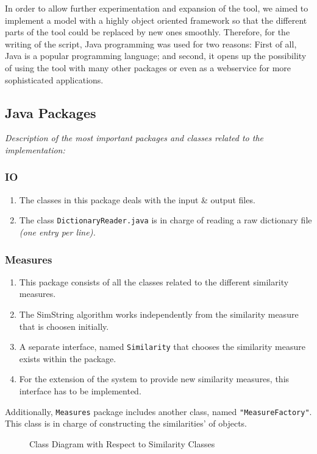 In order to allow further experimentation and expansion of the tool, we aimed to implement a model with a highly object oriented framework so that the different parts of the tool could be replaced by new ones smoothly. Therefore, for the writing of the script, Java programming was used for two reasons: First of all, Java is a popular programming language; and second, it opens up the possibility of using the tool with many other packages or even as a webservice for more sophisticated applications.
\subsection{Java Packages}
\emph{Description of the most important  packages and classes related to the implementation:}
\subsubsection*{IO}
\begin{enumerate}[-]
	\item The classes in this package deals with the input \& output files.
	\item The class \texttt{DictionaryReader.java} is in charge of reading a raw dictionary file \textit{(one entry per line).}
\end{enumerate}

\subsubsection*{Measures}
\begin{enumerate}[-]
	\item This package consists of all the classes related to the different similarity measures.
	\item The SimString algorithm works independently from the similarity measure that is choosen initially.
	\item A separate interface, named \texttt{Similarity} that chooses the similarity measure exists within the package.
	\item For the extension of the system to provide new similarity measures, this interface has to be implemented.
\end{enumerate}
Additionally, \texttt{Measures} package includes another class, named \texttt{"MeasureFactory"}. This class is in charge of constructing the similarities' of objects.

\begin{figure}[h!]
  \caption{Class Diagram with Respect to Similarity Classes}
  \centering
   \label{fig:similarityClasses}  
\end{figure}

